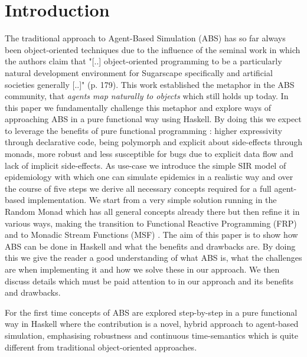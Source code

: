 \section{Introduction}
The traditional approach to Agent-Based Simulation (ABS) has so far always been object-oriented techniques due to the influence of the seminal work \cite{epstein_growing_1996} in which the authors claim that "[..] object-oriented programming to be a particularly natural development environment for Sugarscape specifically and artificial societies generally [..]" (p. 179). This work established the metaphor in the ABS community, that \textit{agents map naturally to objects} \cite{north_managing_2007} which still holds up today.
In this paper we fundamentally challenge this metaphor and explore ways of approaching ABS in a pure functional way using Haskell. By doing this we expect to leverage the benefits of pure functional programming \cite{hudak_history_2007}: higher expressivity through declarative code, being polymorph and explicit about side-effects through monads, more robust and less susceptible for bugs due to explicit data flow and lack of implicit side-effects.
As use-case we introduce the simple SIR model of epidemiology with which one can simulate epidemics in a realistic way and over the course of five steps we derive all necessary concepts required for a full agent-based implementation. We start from a very simple solution running in the Random Monad which has all general concepts already there but then refine it in various ways, making the transition to Functional Reactive Programming (FRP) \cite{wan_functional_2000} and to Monadic Stream Functions (MSF) \cite{perez_functional_2016}.
The aim of this paper is to show how ABS can be done in Haskell and what the benefits and drawbacks are. By doing this we give the reader a good understanding of what ABS is, what the challenges are when implementing it and how we solve these in our approach. We then discuss details which must be paid attention to in our approach and its benefits and drawbacks. 

For the first time concepts of ABS are explored step-by-step in a pure functional way in Haskell where the contribution is a novel, hybrid approach to agent-based simulation, emphasising robustness and continuous time-semantics which is quite different from traditional object-oriented approaches.

